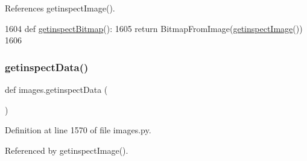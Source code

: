 References getinspect\+Image().


\begin{DoxyCode}
1604 \textcolor{keyword}{def }\hyperlink{namespaceimages_a3b8808244fec6d009105a9172e9dce7a}{getinspectBitmap}():
1605     \textcolor{keywordflow}{return} BitmapFromImage(\hyperlink{namespaceimages_a94ab13bbfd0d57bd0543469f7f8a003f}{getinspectImage}())
1606 
\end{DoxyCode}
\mbox{\label{namespaceimages_aa0295fd7df9df8a8c36dbf45957ebe34}} 
\subsubsection{\texorpdfstring{getinspect\+Data()}{getinspectData()}}
{\footnotesize\ttfamily def images.\+getinspect\+Data (\begin{DoxyParamCaption}{ }\end{DoxyParamCaption})}



Definition at line 1570 of file images.\+py.



Referenced by getinspect\+Image().


